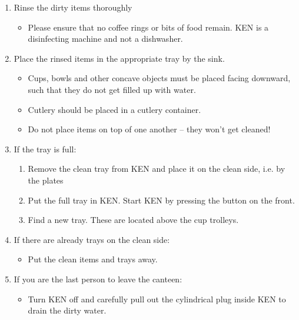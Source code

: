 
\begin{enumerate}
\bfseries \item Rinse the dirty items thoroughly \normalfont
\begin{itemize}

\item Please ensure that no coffee rings or bits of food remain. KEN is a
disinfecting machine and not a dishwasher.

\end{itemize}

\bfseries \item Place the rinsed items in the appropriate tray by the sink.
\normalfont

\begin{itemize}

\item Cups, bowls and other concave objects must be placed facing downward,
such that they do not get filled up with water.

\item Cutlery should be placed in a cutlery container.

\item Do not place items on top of one another -- they won't get cleaned!

\end{itemize}

\bfseries \item If the tray is full: \normalfont

\begin{enumerate}

\item Remove the clean tray from KEN and place it on the clean side, i.e. by
the plates

\item Put the full tray in KEN. Start KEN by pressing the button on the front.

\item Find a new tray. These are located above the cup trolleys.

\end{enumerate}

\bfseries \item If there are already trays on the clean side: \normalfont

\begin{itemize}

\item Put the clean items and trays away.

\end{itemize}

\bfseries \item If you are the last person to leave the canteen: \normalfont

\begin{itemize}

\item Turn KEN off and carefully pull out the cylindrical plug inside KEN to
drain the dirty water.

\end{itemize}

\end{enumerate}

